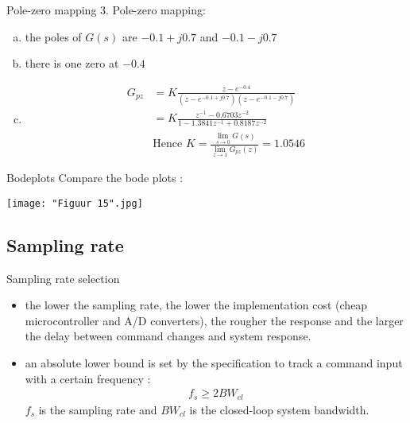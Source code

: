 \begin{frame}{Pole-zero mapping}
3. Pole-zero mapping:
\begin{enumerate}[(a)]
    \item the poles of $G(s)$ are $-0.1 + j0.7$ and $-0.1 -j0.7$
    \item there is one zero at $-0.4$
    \item 
    \vspace{0.1cm}
        \begin{align*}
            G_{pz}&=K\frac{z-e^{-0.4}}{(z-e^{-0.1+j0.7})(z-e^{-0.1-j0.7})}\\
            &=K\frac{z^{-1}-0.6703z^{-2}}{1- 1.3841z^{-1}+0.8187z^{-2}}\\
            &\text{Hence }K=\frac{\lim_{s\to0}G(s)}{\lim_{z\to1}G_{pz}(z)}=1.0546
        \end{align*}
\end{enumerate}
\end{frame}

\begin{frame}{Bodeplots}
Compare the bode plots :
\begin{center}
    \texttt{[image: "Figuur 15".jpg]}\\
\end{center}
\end{frame}
    

\subsection{Sampling rate}
\begin{frame}{Sampling rate selection}  
\begin{itemize}
    \item the lower the sampling rate, the lower the implementation
    cost (cheap microcontroller and A/D converters), the
    rougher the response and the larger the delay between
    command changes and system response.
    \vspace{0.1cm}
    \item an absolute lower bound is set by the specification to
    track a command input with a certain frequency :
    \begin{align*}
    f_s\geq 2BW_{cl}
    \end{align*}
    \vspace{-0.1cm}
    $f_s$ is the sampling rate and $BW_{cl}$ is the closed-loop system  bandwidth.

\end{itemize}
\end{frame}

